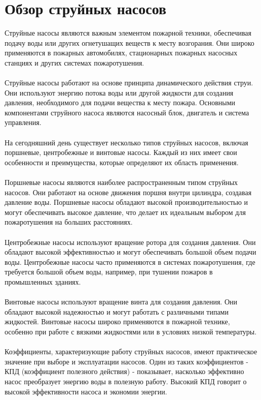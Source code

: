 \documentclass{article}
\begin{document}
\section{Обзор струйных насосов}
Струйные насосы являются важным элементом пожарной техники, обеспечивая подачу воды или других огнетушащих веществ к месту возгорания. Они широко применяются в пожарных автомобилях, стационарных пожарных насосных станциях и других системах пожаротушения.\\
~\\
Струйные насосы работают на основе принципа динамического действия струи. Они используют энергию потока воды или другой жидкости для создания давления, необходимого для подачи вещества к месту пожара. Основными компонентами струйного насоса являются насосный блок, двигатель и система управления.\\
~\\
На сегодняшний день существует несколько типов струйных насосов, включая поршневые, центробежные и винтовые насосы. Каждый из них имеет свои особенности и преимущества, которые определяют их область применения.\\
~\\
Поршневые насосы являются наиболее распространенным типом струйных насосов. Они работают на основе движения поршня внутри цилиндра, создавая давление воды. Поршневые насосы обладают высокой производительностью и могут обеспечивать высокое давление, что делает их идеальным выбором для пожаротушения на больших расстояниях.\\
~\\
Центробежные насосы используют вращение ротора для создания давления. Они обладают высокой эффективностью и могут обеспечивать большой объем подачи воды. Центробежные насосы часто применяются в системах пожаротушения, где требуется большой объем воды, например, при тушении пожаров в промышленных зданиях.\\
~\\
Винтовые насосы используют вращение винта для создания давления. Они обладают высокой надежностью и могут работать с различными типами жидкостей. Винтовые насосы широко применяются в пожарной технике, особенно при работе с вязкими жидкостями или в условиях низкой температуры.\\
~\\
Коэффициенты, характеризующие работу струйных насосов, имеют практическое значение при выборе и эксплуатации насосов. Один из таких коэффициентов - КПД (коэффициент полезного действия) - показывает, насколько эффективно насос преобразует энергию воды в полезную работу. Высокий КПД говорит о высокой эффективности насоса и экономии энергии.\\
\end{document}
